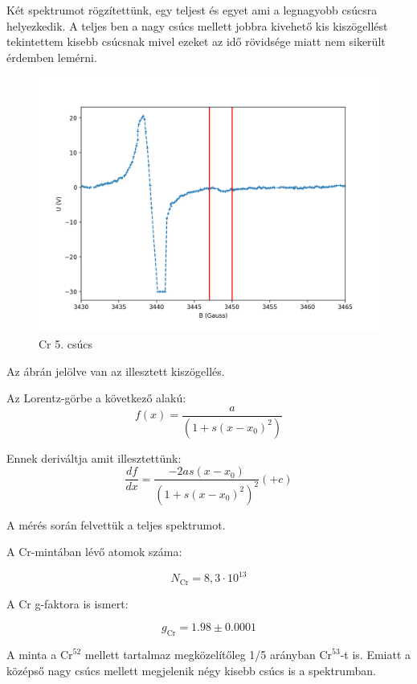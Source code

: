 \documentclass[12pt,a4paper]{article}
\theoremstyle{plain}
\begin{document}
\par Két spektrumot rögzítettünk, egy
teljest és egyet ami a legnagyobb csúcsra
helyezkedik. A teljes ben a nagy csúcs mellett jobbra
kivehető kis kiszögellést tekintettem kisebb csúcsnak
mivel ezeket az idő rövidsége miatt nem sikerült
érdemben lemérni.

\begin{figure}[H]
    \centering
    \includegraphics[width=.6\linewidth]{./alex_cromium.png}
    \caption{Cr 5. csúcs}
\end{figure}

\par Az ábrán jelölve van az illesztett
kiszögellés.

\par Az Lorentz-görbe a következő alakú:
\[  f(x) = \frac{a}{(1+s(x-x_0)^2)}\]

\par Ennek deriváltja amit illesztettünk:
\[ \frac{df}{dx} = \frac{-2as(x-x_0)}{(1+s(x-x_0)^2)^2} (+ c)\]

\par A mérés során felvettük a teljes spektrumot.

\par A \textrm{Cr}-mintában lévő atomok száma:

\begin{equation*}
    N_{\textrm{Cr}} = 8,3 \cdot 10^{13}
\end{equation*}

\par A \textrm{Cr} g-faktora is ismert:

\begin{equation}
    g_{\textrm{Cr}}=1.98 \pm 0.0001
\end{equation}

\par A minta a $\textrm{Cr}^{52}$ mellett tartalmaz
megközelítőleg 1/5 arányban $\textrm{Cr}^{53}$-t is.
Emiatt a középső nagy csúcs mellett megjelenik négy kisebb
csúcs is a spektrumban.
\end{document}
